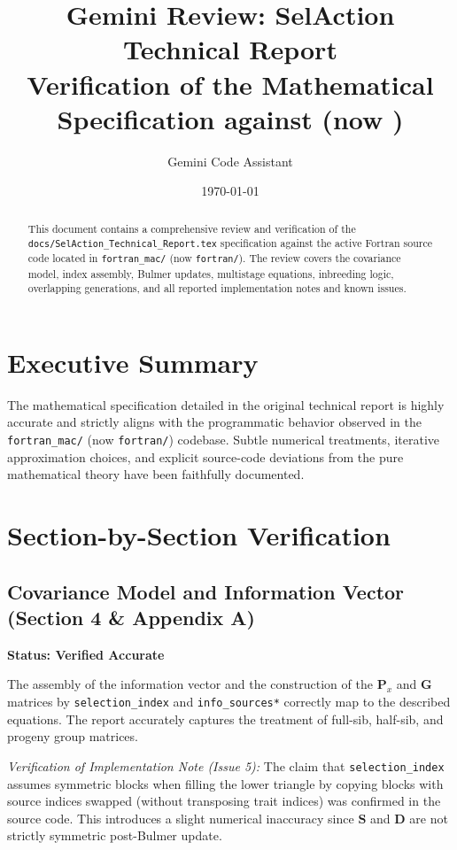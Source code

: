 \documentclass[11pt]{article}
\title{Gemini Review: SelAction Technical Report\\[4pt]
\large Verification of the Mathematical Specification against \src{fortran\_mac/} (now \src{fortran/})}
\author{Gemini Code Assistant}
\date{\today}
\newcommand{\src}[1]{\texttt{#1}}
\begin{document}
\maketitle
\begin{abstract}
This document contains a comprehensive review and verification of the \src{docs/SelAction\_Technical\_Report.tex} specification against the active Fortran source code located in \src{fortran\_mac/} (now \src{fortran/}). The review covers the covariance model, index assembly, Bulmer updates, multistage equations, inbreeding logic, overlapping generations, and all reported implementation notes and known issues.
\end{abstract}

\section{Executive Summary}
The mathematical specification detailed in the original technical report is highly accurate and strictly aligns with the programmatic behavior observed in the \src{fortran\_mac/} (now \src{fortran/}) codebase. Subtle numerical treatments, iterative approximation choices, and explicit source-code deviations from the pure mathematical theory have been faithfully documented. 

\section{Section-by-Section Verification}

\subsection{Covariance Model and Information Vector (Section 4 \& Appendix A)}
\textbf{Status: Verified Accurate}

The assembly of the information vector and the construction of the $\mathbf{P}_x$ and $\mathbf{G}$ matrices by \src{selection\_index} and \src{info\_sources*} correctly map to the described equations. The report accurately captures the treatment of full-sib, half-sib, and progeny group matrices.

\emph{Verification of Implementation Note (Issue 5):} The claim that \src{selection\_index} assumes symmetric blocks when filling the lower triangle by copying blocks with source indices swapped (without transposing trait indices) was confirmed in the source code. This introduces a slight numerical inaccuracy since $\mathbf{S}$ and $\mathbf{D}$ are not strictly symmetric post-Bulmer update.
\end{document}
